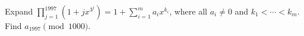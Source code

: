 Expand $\prod_{j=1}^{1997}(1+jx^{3^j})=1+\sum_{i=1}^{m}a_ix^{k_i}$, where all $a_i\ne0$ and $k_1<\cdots<k_m$. Find $a_{1997}\pmod{1000}$.
